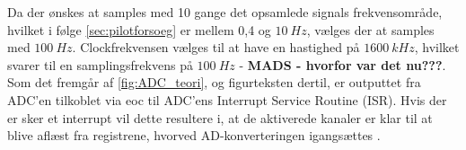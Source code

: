 Da der ønskes at samples med 10 gange det opsamlede signals frekvensområde, hvilket i følge \autoref{sec:pilotforsoeg} er mellem 0,4 og $10~Hz$, vælges der at samples med $100~Hz$. Clockfrekvensen vælges til at have en hastighed på $1600~kHz$, hvilket svarer til en samplingsfrekvens på $100~Hz$ - \textbf{MADS - hvorfor var det nu???}. Som det fremgår af \autoref{fig:ADC_teori}, og figurteksten dertil, er outputtet fra ADC'en tilkoblet via eoc til ADC'ens Interrupt Service Routine (ISR). Hvis der er sker et interrupt vil dette resultere i, at de aktiverede kanaler er klar til at blive aflæst fra registrene, hvorved AD-konverteringen igangsættes \citep{ADC2014}.


